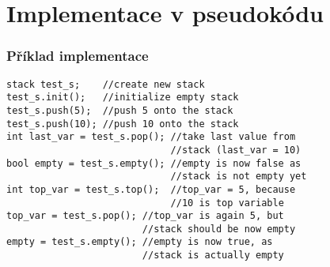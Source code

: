 \documentclass[unicode, breaklinks]{beamer}
\begin{document}
    \section{Implementace v pseudokódu}
    \begin{frame}[fragile]
        \frametitle{Příklad implementace}
        \begin{lstlisting}[basicstyle=\small]
stack test_s;    //create new stack
test_s.init();   //initialize empty stack
test_s.push(5);  //push 5 onto the stack
test_s.push(10); //push 10 onto the stack
int last_var = test_s.pop(); //take last value from
                             //stack (last_var = 10)
bool empty = test_s.empty(); //empty is now false as
                             //stack is not empty yet
int top_var = test_s.top();  //top_var = 5, because
                             //10 is top variable
top_var = test_s.pop(); //top_var is again 5, but
                        //stack should be now empty
empty = test_s.empty(); //empty is now true, as
                        //stack is actually empty
        \end{lstlisting}
    \end{frame}
\end{document}
